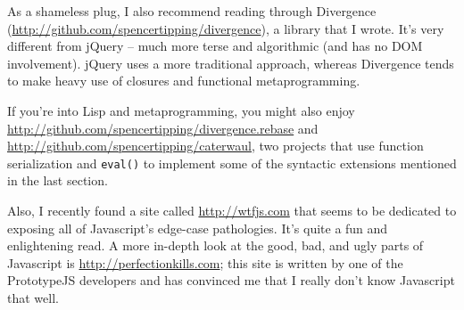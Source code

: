 \documentclass{article}
\begin{document}
  As a shameless plug, I also recommend reading through Divergence (\url{http://github.com/spencertipping/divergence}), a library that I wrote. It's very different from jQuery -- much more
  terse and algorithmic (and has no DOM involvement). jQuery uses a more traditional approach, whereas Divergence tends to make heavy use of closures and functional metaprogramming.
  
  If you're into Lisp and metaprogramming, you might also enjoy \url{http://github.com/spencertipping/divergence.rebase} and \url{http://github.com/spencertipping/caterwaul}, two projects that
  use function serialization and \verb|eval()| to implement some of the syntactic extensions mentioned in the last section.

  Also, I recently found a site called \url{http://wtfjs.com} that seems to be dedicated to exposing all of Javascript's edge-case pathologies. It's quite a fun and enlightening read. A more
  in-depth look at the good, bad, and ugly parts of Javascript is \url{http://perfectionkills.com}; this site is written by one of the PrototypeJS developers and has convinced me that I really
  don't know Javascript that well.
\end{document}
